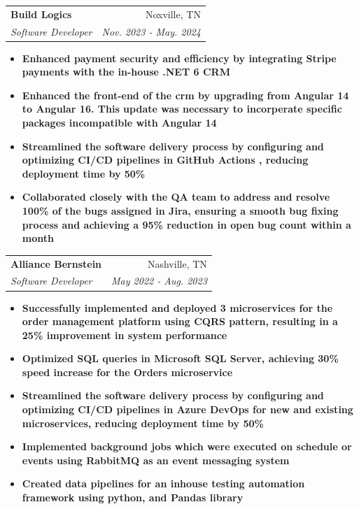 \documentclass[letterpaper,11pt]{article}
\makeatletter
\newcommand{\resumeItem}[1]{
  \item\small{
    \textbf{#1 \vspace{-2pt}}
  }
}
\newcommand{\resumeSubheading}[4]{
  \vspace{-1pt}\item
    \begin{tabular*}{0.97\textwidth}[t]{l@{\extracolsep{\fill}}r}
      \textbf{#1} & #2 \\
      \textit{\small#3} & \textit{\small #4} \\
    \end{tabular*}\vspace{-5pt}
}
\newcommand{\resumeItemListStart}{\begin{itemize}}
\newcommand{\resumeItemListEnd}{\end{itemize}\vspace{-5pt}}
\makeatother
\begin{document}
\resumeSubheading
{Build Logics}{Noxville, TN}
{Software Developer}{Nov. 2023 - May. 2024}
\resumeItemListStart
\resumeItem{Enhanced payment security and efficiency by integrating Stripe payments with the in-house .NET 6 CRM}
\resumeItem{Enhanced the front-end of the crm by upgrading from Angular 14 to Angular 16. This update was necessary to incorperate specific packages incompatible with Angular 14}
\resumeItem{Streamlined the software delivery process by configuring and optimizing CI/CD pipelines in GitHub Actions , reducing deployment time by 50\%}
\resumeItem{Collaborated closely with the QA team to address and resolve 100\% of the bugs assigned in Jira, ensuring a smooth bug fixing process and achieving a 95\% reduction in open bug count within a month}
\resumeItemListEnd

\resumeSubheading
{Alliance Bernstein}{Nashville, TN}
{Software Developer}{May 2022 - Aug. 2023}
\resumeItemListStart
\resumeItem{Successfully implemented and deployed 3 microservices for the order management platform using CQRS pattern, resulting in a 25\% improvement in system performance}
\resumeItem{Optimized SQL queries in Microsoft SQL Server, achieving 30\% speed increase for the Orders microservice}
\resumeItem{Streamlined the software delivery process by configuring and optimizing CI/CD pipelines in Azure DevOps for new and existing microservices, reducing deployment time by 50\%}
\resumeItem{Implemented background jobs which were executed on schedule or events using RabbitMQ as an event messaging system}
\resumeItem{Created data pipelines for an inhouse testing automation framework using python, and Pandas library}
\resumeItemListEnd
\end{document}
